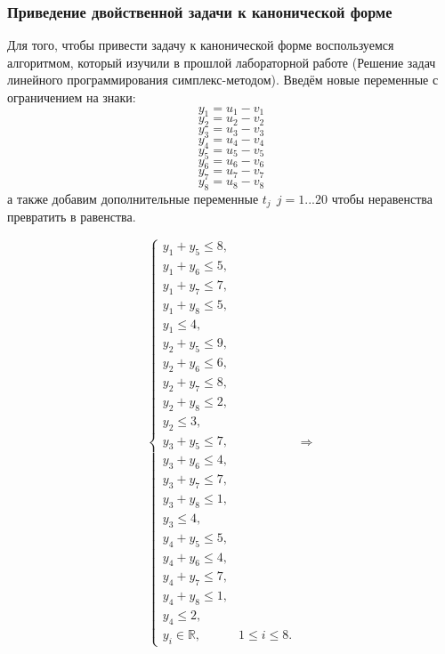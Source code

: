 \documentclass{article}
\begin{document}
\subsubsection{Приведение двойственной задачи к канонической форме}
\noindent Для того, чтобы привести задачу к канонической форме воспользуемся алгоритмом, который изучили в прошлой лабораторной работе (Решение задач линейного программирования симплекс-методом). Введём новые переменные с ограничением на знаки:
$$y_1=u_1-v_1$$
$$y_2=u_2-v_2$$
$$y_3=u_3-v_3$$
$$y_4=u_4-v_4$$
$$y_5=u_5-v_5$$
$$y_6=u_6-v_6$$
$$y_7=u_7-v_7$$
$$y_8=u_8-v_8$$
а также добавим дополнительные переменные $t_j~~j=1...20$ чтобы неравенства превратить в равенства.

\begin{equation*}
    \begin{cases}
        \displaystyle y_1 + y_5 \leq 8,\\
        \displaystyle y_1 + y_6 \leq 5,\\
        \displaystyle y_1 + y_7 \leq 7,\\
        \displaystyle y_1 + y_8 \leq 5,\\
        \displaystyle y_1 \leq 4,\\
        \displaystyle y_2 + y_5 \leq 9,\\
        \displaystyle y_2 + y_6 \leq 6,\\
        \displaystyle y_2 + y_7 \leq 8,\\
        \displaystyle y_2 + y_8 \leq 2,\\
        \displaystyle y_2  \leq 3,\\
        \displaystyle y_3 + y_5 \leq 7,\\
        \displaystyle y_3 + y_6 \leq 4,\\
        \displaystyle y_3 + y_7 \leq 7,\\
        \displaystyle y_3 + y_8 \leq 1,\\
        \displaystyle y_3\leq 4,\\
        \displaystyle y_4 + y_5 \leq 5,\\
        \displaystyle y_4 + y_6 \leq 4,\\
        \displaystyle y_4 + y_7 \leq 7,\\
        \displaystyle y_4 + y_8 \leq 1,\\
        \displaystyle y_4\leq 2,\\
        \displaystyle y_{i}\in \mathbb{R}, &1\leq i \leq 8.
    \end{cases}
    \Rightarrow

\end{equation*}
\end{document}
